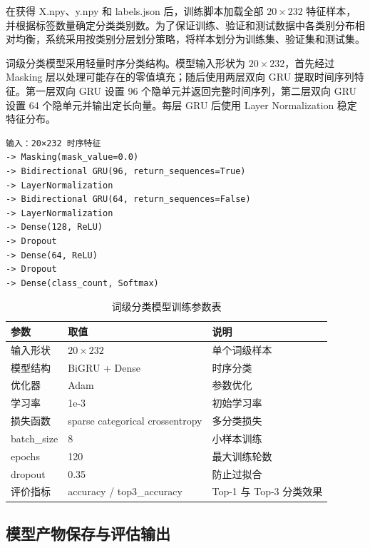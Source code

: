 

在获得 X.npy、y.npy 和 labels.json 后，训练脚本加载全部 $20\times232$ 特征样本，并根据标签数量确定分类类别数。为了保证训练、验证和测试数据中各类别分布相对均衡，系统采用按类别分层划分策略，将样本划分为训练集、验证集和测试集。

词级分类模型采用轻量时序分类结构。模型输入形状为 $20\times232$，首先经过 Masking 层以处理可能存在的零值填充；随后使用两层双向 GRU 提取时间序列特征。第一层双向 GRU 设置 96 个隐单元并返回完整时间序列，第二层双向 GRU 设置 64 个隐单元并输出定长向量。每层 GRU 后使用 Layer Normalization 稳定特征分布。

\begin{lstlisting}[style=whuCode,caption={词级分类模型结构},label={lst:chapter06-word-classifier-structure}]
输入：20×232 时序特征
-> Masking(mask_value=0.0)
-> Bidirectional GRU(96, return_sequences=True)
-> LayerNormalization
-> Bidirectional GRU(64, return_sequences=False)
-> LayerNormalization
-> Dense(128, ReLU)
-> Dropout
-> Dense(64, ReLU)
-> Dropout
-> Dense(class_count, Softmax)
\end{lstlisting}

\begin{longtable}{L{0.24\textwidth} L{0.24\textwidth} L{0.40\textwidth}}
  \caption{词级分类模型训练参数表}
  \label{tab:chapter06-word-model-train-params}\\
  \toprule
  参数 & 取值 & 说明 \\
  \midrule
  输入形状 & $20\times232$ & 单个词级样本 \\
  模型结构 & BiGRU + Dense & 时序分类 \\
  优化器 & Adam & 参数优化 \\
  学习率 & 1e-3 & 初始学习率 \\
  损失函数 & sparse categorical crossentropy & 多分类损失 \\
  batch\_size & 8 & 小样本训练 \\
  epochs & 120 & 最大训练轮数 \\
  dropout & 0.35 & 防止过拟合 \\
  评价指标 & accuracy / top3\_accuracy & Top-1 与 Top-3 分类效果 \\
  \bottomrule
\end{longtable}

\subsection{模型产物保存与评估输出}

